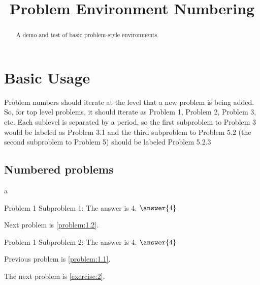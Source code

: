 \documentclass{ximera}
\title{Problem Environment Numbering}
\begin{document}
\begin{abstract}
    A demo and test of basic problem-style environments.
\end{abstract}
\maketitle

\section{Basic Usage}
Problem numbers should iterate at the level that a new problem is being added. So, for top level problems, it should iterate as
Problem 1, Problem 2, Problem 3, etc. Each sublevel is separated by a period, so the first subproblem to Problem 3 would be
labeled as Problem 3.1 and the third subproblem to Problem 5.2 (the second subproblem to Problem 5) should be labeled Problem 5.2.3



\numberedProblemstrue
\subsection{Numbered problems}

\begin{exercise}\label{exercise:1} a

        \begin{problem}\label{problem:1.1}
            Problem 1 Subproblem 1: The answer is 4. $\answer{4}$ 
            \par\medskip
            Next problem is \ref{problem:1.2}.
            \medskip
        \end{problem} 
        \begin{problem}\label{problem:1.2}
            Problem 1 Subproblem 2: The answer is 4. $\answer{4}$ 
            \par\medskip
            Previous problem is \ref{problem:1.1}.
            \medskip
        \end{problem} 
    The next problem is \ref{exercise:2}.
    \medskip
\end{exercise} 
\end{document}

